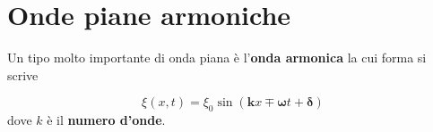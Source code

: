 \documentclass[x11names]{report}
\newcommand{\viola}[1]{\colorbox{yred}{$\displaystyle #1$}}
\begin{document}
%	
%	
%	
%	
%	
	\newpage
	\section{Onde piane armoniche}
	Un tipo molto importante di onda piana è l'\textbf{onda armonica} la cui forma si scrive
	
	\[ 
	\xi(x,t) = \xi_0 \sin\left(\boldsymbol{k}x \mp \boldsymbol{\omega} t + \boldsymbol{\delta}\right)
	\]
	dove \(k\) è il \textbf{numero d'onde}.
	
\end{document}
